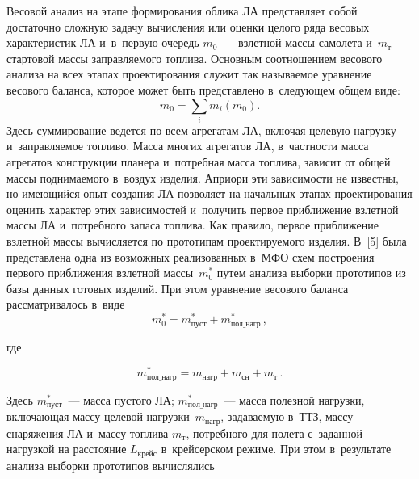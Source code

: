 \begin{multicols}{2}

  Весовой анализ на этапе формирования облика ЛА представляет собой 
достаточно слож\-ную задачу вы\-чис\-ле\-ния или оценки целого ряда весовых 
характеристик ЛА и~в~первую очередь $m_0$~--- взлетной массы самолета 
и~$m_{\mathrm{т}}$~--- стартовой массы заправляемого топлива. Основным 
соотношением весового анализа на всех этапах проектирования служит так 
на\-зы\-ва\-емое уравнение весового баланса, которое может быть пред\-став\-ле\-но 
в~сле\-ду\-ющем общем \mbox{виде}:
  $$
  m_0=\sum\limits_i m_i(m_0).
  $$
  Здесь суммирование ведется по всем агрегатам ЛА, включая целевую 
нагрузку и~за\-прав\-ля\-емое топ\-ли\-во. Масса многих агрегатов ЛА, в~част\-ности 
масса агрегатов конструкции планера и~потребная масса топ\-ли\-ва, зависит от 
общей массы поднимаемого в~воздух изделия. Априори эти зависимости не 
известны, но име\-ющий\-ся опыт создания ЛА позволяет на начальных этапах 
проектирования оценить характер этих зависимостей и~получить первое 
приближение взлетной массы ЛА и~потребного запаса топ\-ли\-ва. Как правило, 
первое при\-бли\-же\-ние взлетной массы вычисляется по прототипам 
проектируемого изделия. В~[5] была представлена одна из возможных 
реализованных в~МФО схем по\-стро\-ения первого приближения взлетной 
массы~$m_0^*$ путем анализа выборки прототипов из базы данных готовых 
изделий. При этом уравнение весового баланса рас\-смат\-ри\-ва\-лось в~виде
  $$
  m_0^*= m^*_{\mathrm{пуст}} +m^*_{\mathrm{пол\_нагр}}\,,
  $$
  
  \vspace*{-7pt}
  
  \noindent
  где
  
  \vspace*{-3pt}
  
  \noindent
  $$
  m^*_{\mathrm{пол\_нагр}} =m_{\mathrm{нагр}} +m_{\mathrm{сн}} + 
m_{\mathrm{т}}\,.
  $$
  
  \vspace*{-4pt}
  
  \noindent
Здесь $m^*_{\mathrm{пуст}}$~--- масса пустого ЛА; $ 
m^*_{\mathrm{пол\_нагр}}$~--- масса полезной нагрузки, вклю\-ча\-ющая массу 
целевой на\-груз\-ки~$ m_{\mathrm{нагр}}$, за\-да\-ва\-емую в~ТТЗ, массу снаряжения 
ЛА  и~массу топ\-ли\-ва $ m_{\mathrm{т}}$, потребного для полета с~заданной 
на\-груз\-кой на рас\-сто\-яние $L_{\mathrm{крейс}}$ в~крейсерском режиме. При 
этом в~результате анализа выборки прототипов вы\-чис\-ля\-лись 


\end{multicols}
